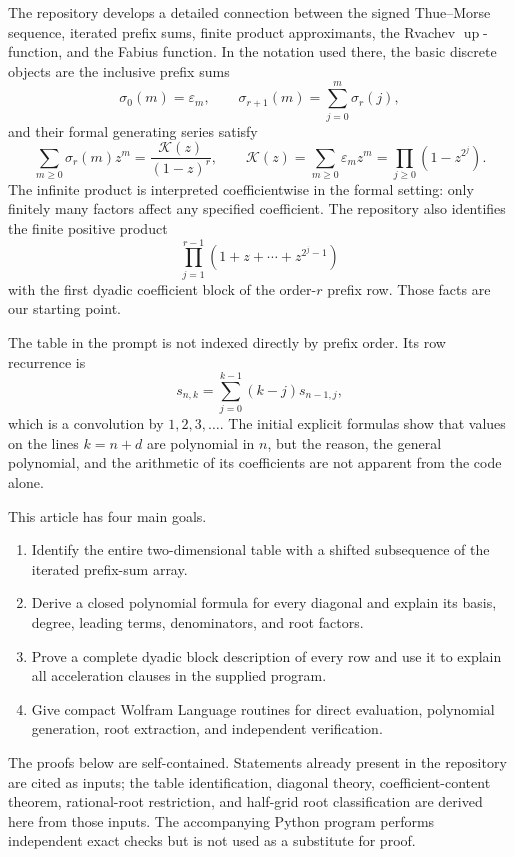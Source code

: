 \documentclass[11pt]{article}
\theoremstyle{definition}
\theoremstyle{remark}
\newcommand{\eps}{\varepsilon}
\newcommand{\K}{\mathcal K}
\begin{document}
The repository \cite{ProveIt} develops a detailed connection between the
signed Thue--Morse sequence, iterated prefix sums, finite product
approximants, the Rvachev \(\operatorname{up}\)-function, and the Fabius
function.  In the notation used there, the basic discrete objects are the
inclusive prefix sums
\[
 \sigma_0(m)=\eps_m,
 \qquad
 \sigma_{r+1}(m)=\sum_{j=0}^{m}\sigma_r(j),
\]
and their formal generating series satisfy
\[
 \sum_{m\geq0}\sigma_r(m)z^m
   =\frac{\K(z)}{(1-z)^r},
 \qquad
 \K(z)=\sum_{m\geq0}\eps_mz^m
       =\prod_{j\geq0}(1-z^{2^j}).
\]
The infinite product is interpreted coefficientwise in the formal setting:
only finitely many factors affect any specified coefficient.  The repository
also identifies the finite positive product
\[
 \prod_{j=1}^{r-1}(1+z+\cdots+z^{2^j-1})
\]
with the first dyadic coefficient block of the order-\(r\) prefix row.
Those facts are our starting point.

The table in the prompt is not indexed directly by prefix order.  Its row
recurrence is
\begin{equation}
 s_{n,k}=\sum_{j=0}^{k-1}(k-j)s_{n-1,j},                 \label{eq:user-rec}
\end{equation}
which is a convolution by \(1,2,3,\ldots\).  The initial explicit formulas
show that values on the lines \(k=n+d\) are polynomial in \(n\), but the
reason, the general polynomial, and the arithmetic of its coefficients are
not apparent from the code alone.

This article has four main goals.

\begin{enumerate}[leftmargin=2.2em]
\item Identify the entire two-dimensional table with a shifted subsequence of
the iterated prefix-sum array.
\item Derive a closed polynomial formula for every diagonal and explain its
basis, degree, leading terms, denominators, and root factors.
\item Prove a complete dyadic block description of every row and use it to
explain all acceleration clauses in the supplied program.
\item Give compact Wolfram Language routines for direct evaluation,
polynomial generation, root extraction, and independent verification.
\end{enumerate}

The proofs below are self-contained.  Statements already present in the
repository are cited as inputs; the table identification, diagonal theory,
coefficient-content theorem, rational-root restriction, and half-grid root
classification are derived here from those inputs.  The accompanying Python
program performs independent exact checks but is not used as a substitute
for proof.
\end{document}

